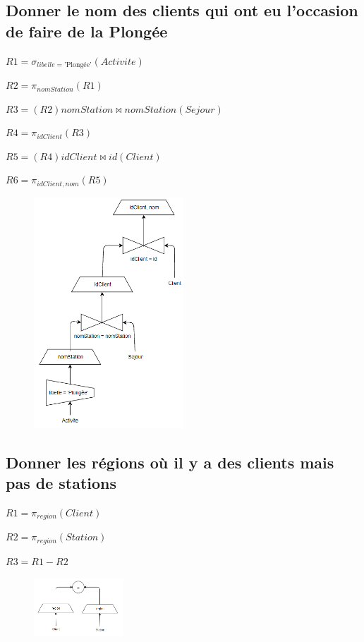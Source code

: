 \documentclass{article}
\begin{document}
\subsection{Donner le nom des clients qui ont eu l’occasion de faire de la Plongée}

$ R1 = \sigma_{libelle = \text{'Plongée'}}(Activite)$

$ R2 = \pi_{nomStation}(R1)$

$ R3 = (R2)nomStation \Join nomStation(Sejour)$

$ R4 = \pi_{idClient}(R3)$

$ R5 = (R4)idClient \Join id(Client)$

$ R6 = \pi_{idClient, nom}(R5)$

\begin{figure}[H]
  \centering
  \includegraphics[width=0.5\textwidth]{imgAlgGraph/14.png}
  \label{fig:14}
\end{figure}

\subsection{Donner les régions où il y a des clients mais pas de stations}

$ R1 = \pi_{region}(Client)$

$ R2 = \pi_{region}(Station)$

$ R3 = R1 - R2$

\begin{figure}[H]
  \centering
  \includegraphics[width=0.3\textwidth]{imgAlgGraph/15.png}
  \label{fig:15}
\end{figure}
\end{document}
